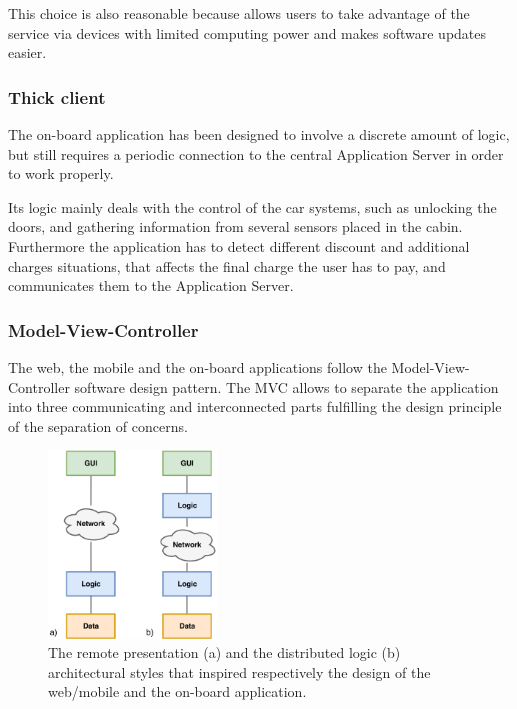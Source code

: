 This choice is also reasonable because allows users to take advantage of the service via devices with limited computing power and makes software updates easier.

\subsubsection{Thick client}
The on-board application has been designed to involve a discrete amount of logic, but still requires a periodic connection to the central Application Server in order to work properly.

Its logic mainly deals with the control of the car systems, such as unlocking the doors, and gathering information from several sensors placed in the cabin. Furthermore the application has to detect different discount and additional charges situations, that affects the final charge the user has to pay, and communicates them to the Application Server.

\subsubsection{Model-View-Controller}
The web, the mobile and the on-board applications follow the Model-View-Controller software design pattern. The MVC allows to separate the application into three communicating and interconnected parts fulfilling the design principle of the separation of concerns.


\begin{figure}[H]
\begin{center}
		\includegraphics[width=0.4\textwidth]{./arch_design/diagrams/architectural_patterns.png}
		\caption{The remote presentation (a) and the distributed logic (b) architectural styles that inspired respectively the design of the web/mobile and the on-board application.}
		\label{arch_patterns}
\end{center}
\end{figure}